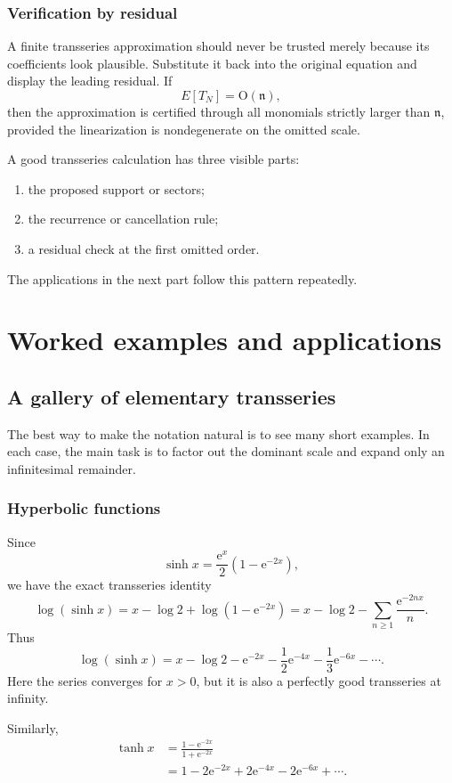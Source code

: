 \documentclass[11pt,openany]{book}
\theoremstyle{plain}
\theoremstyle{definition}
\theoremstyle{remark}
\newcommand{\n}{\mathfrak{n}}
\newcommand{\bigO}{\mathrm{O}}
\newcommand{\e}{\mathrm{e}}
\begin{document}
\section{Verification by residual}
A finite transseries approximation should never be trusted merely because its coefficients look plausible. Substitute it back into the original equation and display the leading residual. If
\[
  E[T_N]=\bigO(\n),
\]
then the approximation is certified through all monomials strictly larger than $\n$, provided the linearization is nondegenerate on the omitted scale.

\begin{checkpointbox}
A good transseries calculation has three visible parts:
\begin{enumerate}
\item the proposed support or sectors;
\item the recurrence or cancellation rule;
\item a residual check at the first omitted order.
\end{enumerate}
The applications in the next part follow this pattern repeatedly.
\end{checkpointbox}

\part{Worked examples and applications}

\chapter{A gallery of elementary transseries}
\label{chap:gallery}

The best way to make the notation natural is to see many short examples. In each case, the main task is to factor out the dominant scale and expand only an infinitesimal remainder.

\section{Hyperbolic functions}
Since
\[
  \sinh x=\frac{\e^x}{2}(1-\e^{-2x}),
\]
we have the exact transseries identity
\[
  \log(\sinh x)
  =x-\log2+\log(1-\e^{-2x})
  =x-\log2-\sum_{n\ge1}\frac{\e^{-2nx}}{n}.
\]
Thus
\[
  \log(\sinh x)
  =x-\log2-\e^{-2x}-\frac12\e^{-4x}
   -\frac13\e^{-6x}-\cdots.
\]
Here the series converges for $x>0$, but it is also a perfectly good transseries at infinity.

Similarly,
\begin{align*}
  \tanh x
  &=\frac{1-\e^{-2x}}{1+\e^{-2x}}\\
  &=1-2\e^{-2x}+2\e^{-4x}
    -2\e^{-6x}+\cdots.
\end{align*}
\end{document}
